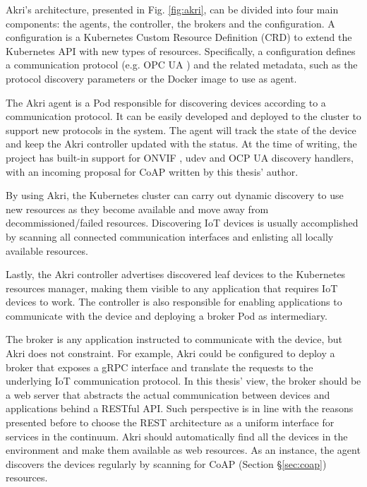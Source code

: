 Akri's architecture, presented in Fig. \ref{fig:akri}, can be divided into four main components: the agents, the controller, the brokers and the configuration. A configuration is a Kubernetes Custom Resource Definition (CRD) to extend the Kubernetes API with new types of resources. Specifically, a configuration defines a communication protocol (e.g. OPC UA \cite{rest-opc}) and the related metadata, such as the protocol discovery parameters or the Docker image to use as agent.

The Akri agent is a Pod responsible for discovering devices according to a communication protocol. It can be easily developed and deployed to the cluster to support new protocols in the system. The agent will track the state of the device and keep the Akri controller updated with the status. At the time of writing, the project has built-in support for ONVIF \cite{onvif}, udev \cite{udev} and OCP UA \cite{rest-opc} discovery handlers, with an incoming proposal for CoAP \cite{coap} written by this thesis' author.

By using Akri, the Kubernetes cluster can carry out dynamic discovery to use new resources as they become available and move away from decommissioned/failed resources. Discovering IoT devices is usually accomplished by scanning all connected communication interfaces and enlisting all locally available resources.

Lastly, the Akri controller advertises discovered leaf devices to the Kubernetes resources manager, making them visible to any application that requires IoT devices to work. The controller is also responsible for enabling applications to communicate with the device and deploying a broker Pod as intermediary. 

The broker is any application instructed to communicate with the device, but Akri does not constraint. For example, Akri could be configured to deploy a broker that exposes a gRPC \cite{gRPC} interface and translate the requests to the underlying IoT communication protocol. In this thesis' view, the broker should be a web server that abstracts the actual communication between devices and applications behind a RESTful API. Such perspective is in line with the reasons presented before to choose the REST architecture as a uniform interface for services in the continuum. Akri should automatically find all the devices in the environment and make them available as web resources. As an instance, the agent discovers the devices regularly by scanning for CoAP (Section §\ref{sec:coap}) resources.

